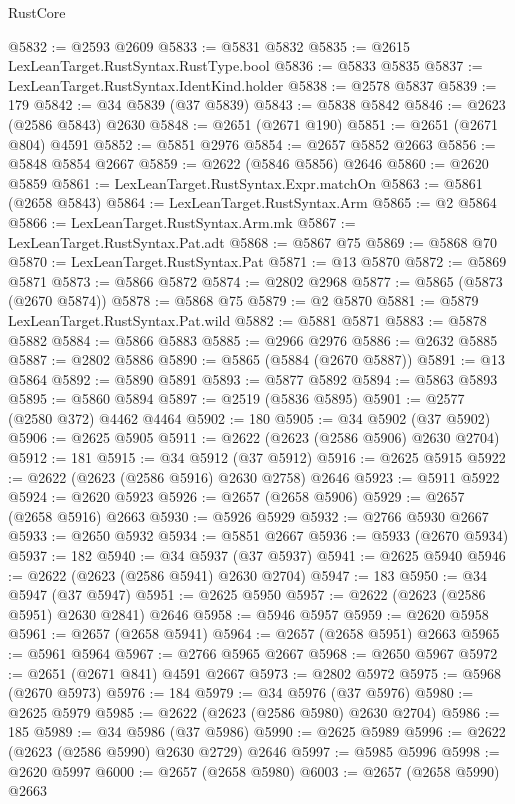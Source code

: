 \begin{lexlean}{RustCore}
\begin{coremodule}
@5832 := @2593 @2609
@5833 := @5831 @5832
@5835 := @2615 LexLeanTarget.RustSyntax.RustType.bool
@5836 := @5833 @5835
@5837 := LexLeanTarget.RustSyntax.IdentKind.holder
@5838 := @2578 @5837
@5839 := 179
@5842 := @34 @5839 (@37 @5839)
@5843 := @5838 @5842
@5846 := @2623 (@2586 @5843) @2630
@5848 := @2651 (@2671 @190)
@5851 := @2651 (@2671 @804) @4591
@5852 := @5851 @2976
@5854 := @2657 @5852 @2663
@5856 := @5848 @5854 @2667
@5859 := @2622 (@5846 @5856) @2646
@5860 := @2620 @5859
@5861 := LexLeanTarget.RustSyntax.Expr.matchOn
@5863 := @5861 (@2658 @5843)
@5864 := LexLeanTarget.RustSyntax.Arm
@5865 := @2 @5864
@5866 := LexLeanTarget.RustSyntax.Arm.mk
@5867 := LexLeanTarget.RustSyntax.Pat.adt
@5868 := @5867 @75
@5869 := @5868 @70
@5870 := LexLeanTarget.RustSyntax.Pat
@5871 := @13 @5870
@5872 := @5869 @5871
@5873 := @5866 @5872
@5874 := @2802 @2968
@5877 := @5865 (@5873 (@2670 @5874))
@5878 := @5868 @75
@5879 := @2 @5870
@5881 := @5879 LexLeanTarget.RustSyntax.Pat.wild
@5882 := @5881 @5871
@5883 := @5878 @5882
@5884 := @5866 @5883
@5885 := @2966 @2976
@5886 := @2632 @5885
@5887 := @2802 @5886
@5890 := @5865 (@5884 (@2670 @5887))
@5891 := @13 @5864
@5892 := @5890 @5891
@5893 := @5877 @5892
@5894 := @5863 @5893
@5895 := @5860 @5894
@5897 := @2519 (@5836 @5895)
@5901 := @2577 (@2580 @372) @4462 @4464
@5902 := 180
@5905 := @34 @5902 (@37 @5902)
@5906 := @2625 @5905
@5911 := @2622 (@2623 (@2586 @5906) @2630 @2704)
@5912 := 181
@5915 := @34 @5912 (@37 @5912)
@5916 := @2625 @5915
@5922 := @2622 (@2623 (@2586 @5916) @2630 @2758) @2646
@5923 := @5911 @5922
@5924 := @2620 @5923
@5926 := @2657 (@2658 @5906)
@5929 := @2657 (@2658 @5916) @2663
@5930 := @5926 @5929
@5932 := @2766 @5930 @2667
@5933 := @2650 @5932
@5934 := @5851 @2667
@5936 := @5933 (@2670 @5934)
@5937 := 182
@5940 := @34 @5937 (@37 @5937)
@5941 := @2625 @5940
@5946 := @2622 (@2623 (@2586 @5941) @2630 @2704)
@5947 := 183
@5950 := @34 @5947 (@37 @5947)
@5951 := @2625 @5950
@5957 := @2622 (@2623 (@2586 @5951) @2630 @2841) @2646
@5958 := @5946 @5957
@5959 := @2620 @5958
@5961 := @2657 (@2658 @5941)
@5964 := @2657 (@2658 @5951) @2663
@5965 := @5961 @5964
@5967 := @2766 @5965 @2667
@5968 := @2650 @5967
@5972 := @2651 (@2671 @841) @4591 @2667
@5973 := @2802 @5972
@5975 := @5968 (@2670 @5973)
@5976 := 184
@5979 := @34 @5976 (@37 @5976)
@5980 := @2625 @5979
@5985 := @2622 (@2623 (@2586 @5980) @2630 @2704)
@5986 := 185
@5989 := @34 @5986 (@37 @5986)
@5990 := @2625 @5989
@5996 := @2622 (@2623 (@2586 @5990) @2630 @2729) @2646
@5997 := @5985 @5996
@5998 := @2620 @5997
@6000 := @2657 (@2658 @5980)
@6003 := @2657 (@2658 @5990) @2663

\end{coremodule}
\end{lexlean}
